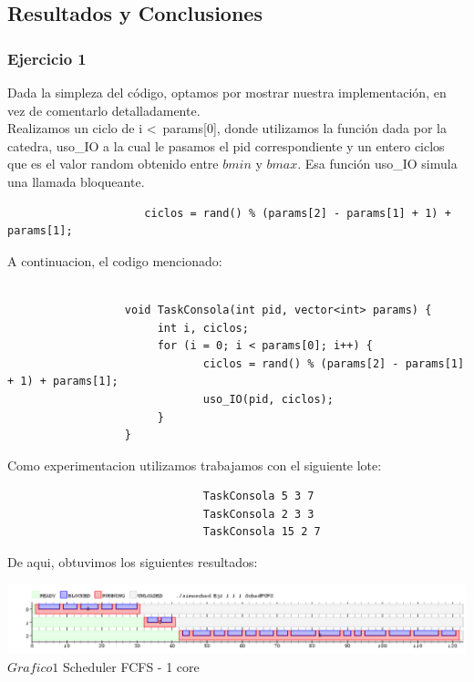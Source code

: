 \subsection{Resultados y Conclusiones}

\subsubsection[Resolución Ejercicio 1]{Ejercicio 1}

\indent Dada la simpleza del código, optamos por mostrar nuestra implementación, en vez de comentarlo detalladamente.\\
\indent Realizamos un ciclo de i \textless \ params[0], donde utilizamos la función dada por la catedra, uso\_IO a la cual le pasamos
el pid correspondiente y un entero ciclos que es el valor random obtenido entre $bmin$ y $bmax$. Esa función uso\_IO simula una llamada bloqueante.
\begin{center}
 \begin{verbatim}
                     ciclos = rand() % (params[2] - params[1] + 1) + params[1];
 \end{verbatim}

\end{center}

\indent A continuacion, el codigo mencionado:

\begin{verbatim}

                  void TaskConsola(int pid, vector<int> params) {
                       int i, ciclos;              
                       for (i = 0; i < params[0]; i++) {
                              ciclos = rand() % (params[2] - params[1] + 1) + params[1];  
                              uso_IO(pid, ciclos);
                       }
                  } 

\end{verbatim}

\indent Como experimentacion utilizamos trabajamos con el siguiente lote:\\

\begin{verbatim}
                              TaskConsola 5 3 7
                              TaskConsola 2 3 3
                              TaskConsola 15 2 7
\end{verbatim}

De aqui, obtuvimos los siguientes resultados:\\

\vspace*{0.3cm} \vspace*{0.3cm}
  \begin{center}
 \includegraphics[scale=0.5]{./Test/ej1.png}
 { $Grafico 1$ Scheduler FCFS - 1 core }
 \end{center}
  \vspace*{0.3cm}



